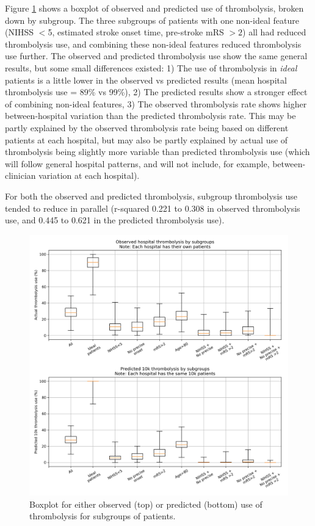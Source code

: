 Figure \ref{fig:results_boxplot} shows a boxplot of observed and predicted use of thrombolysis, broken down by subgroup. The three subgroups of patients with one non-ideal feature (NIHSS $<$5, estimated stroke onset time, pre-stroke mRS $>2$) all had reduced thrombolysis use, and combining these non-ideal features reduced thrombolysis use further. The observed and predicted thrombolysis use show the same general results, but some small differences existed: 1) The use of thrombolysis in \emph{ideal} patients is a little lower in the observed vs predicted results (mean hospital thrombolysis use = 89\% vs 99\%), 2) The predicted results show a stronger effect of combining non-ideal features, 3) The observed thrombolysis rate shows higher between-hospital variation than the predicted thrombolysis rate. This may be partly explained by the observed thrombolysis rate being based on different patients at each hospital, but may also be partly explained by actual use of thrombolysis being slightly more variable than predicted thrombolysis use (which will follow general hospital patterns, and will not include, for example, between-clinician variation at each hospital).

For both the observed and predicted thrombolysis, subgroup thrombolysis use tended to reduce in parallel (r-squared 0.221 to 0.308 in observed thrombolysis use, and 0.445 to 0.621 in the predicted thrombolysis use). 

\begin{figure}[!h]
\centering
\includegraphics[width=1\textwidth]{./images/15a_actual_vs_modelled_subgroup_violin}
\caption{Boxplot for either observed (top) or predicted (bottom) use of thrombolysis for subgroups of patients.}
\label{fig:results_boxplot}
\end{figure}

